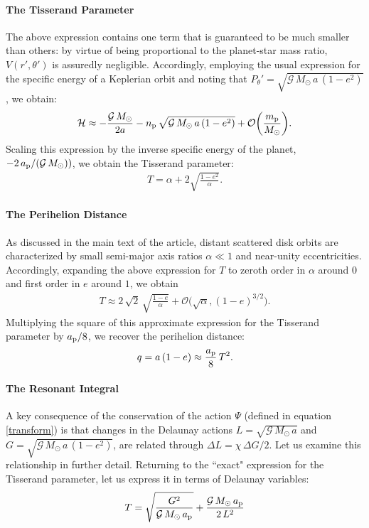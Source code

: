 \documentclass[twocolumn]{aastex62}
\newcommand{\G}{\mathcal{G}}
\newcommand{\Msun}{M_{\odot}}
\newcommand{\Ham}{\mathcal{H}}
\newcommand{\order}{\mathcal{O}}
\begin{document}
\begin{appendix}
\paragraph{The Tisserand Parameter}  The above expression contains one term that is guaranteed to be much smaller than others: by virtue of being proportional to the planet-star mass ratio, $V(r',\theta')$ is assuredly negligible. Accordingly, employing the usual expression for the specific energy of a Keplerian orbit and noting that $P_{\theta}'=\sqrt{\G\,\Msun\,a\,(1-e^2)}$, we obtain:
\begin{align}
\Ham \approx - \frac{\G\,\Msun}{2a}-n_{\rm{p}}\,\sqrt{\G\,\Msun\,a\,(1-e^2)} +\order\bigg(\frac{m_{\rm{p}}}{\Msun} \bigg).
\end{align}
Scaling this expression by the inverse specific energy of the planet, $-2\,a_{\rm{p}}/(\G\,\Msun))$, we obtain the Tisserand parameter:
\begin{align}
T=\alpha+2\sqrt{\frac{1-e^2}{\alpha}}.
\end{align}

\paragraph{The Perihelion Distance} As discussed in the main text of the article, distant scattered disk orbits are characterized by small semi-major axis ratios $\alpha\ll1$ and near-unity eccentricities. Accordingly, expanding the above expression for $T$ to zeroth order in $\alpha$ around $0$ and first order in $e$ around $1$, we obtain
\begin{align}
T\approx2\,\sqrt{2}\,\sqrt{\frac{1-e}{\alpha}}+\order\big(\sqrt{\alpha},(1-e)^{3/2} \big).
\end{align}
Multiplying the square of this approximate expression for the Tisserand parameter by $a_{\rm{p}}/8$, we recover the perihelion distance:
\begin{align}
q=a\,(1-e)\approx\frac{a_{\rm{p}}}{8}\,T^2.
\end{align}

\paragraph{The Resonant Integral} A key consequence of the conservation of the action $\Psi$ (defined in equation \ref{transform}) is that changes in the Delaunay actions $L=\sqrt{\G\,\Msun\,a}$ and $G=\sqrt{\G\,\Msun\,a\,(1-e^2)}$, are related through $\Delta L=\chi\,\Delta G/2$. Let us examine this relationship in further detail. Returning to the ``exact" expression for the Tisserand parameter, let us express it in terms of Delaunay variables: 
\begin{align}
T=\sqrt{\frac{G^2}{\G\,\Msun\,a_{\rm{p}}}}+\frac{\G\,\Msun\,a_{\rm{p}}}{2\,L^2}
\end{align}


\end{appendix}
\end{document}
